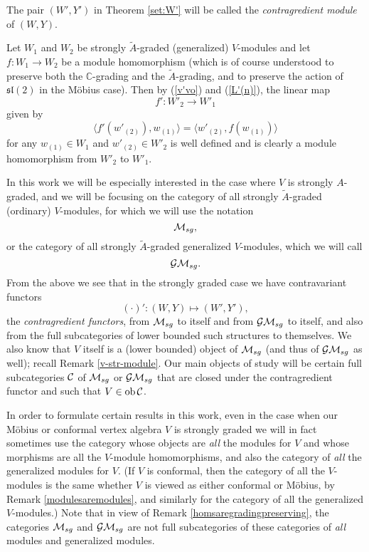 \documentclass[12pt]{article}
\begin{document}
\begin{defi}{\rm
The pair $(W',Y')$ in Theorem \ref{set:W'} will be called the {\em
contragredient module} of $(W,Y)$.}
\end{defi}

Let $W_1$ and $W_2$ be strongly $\tilde A$-graded (generalized)
$V$-modules and let $f:W_1\to W_2$ be a module homomorphism (which is
of course understood to preserve both the ${\mathbb C}$-grading and the
$\tilde A$-grading, and to preserve the action of ${\mathfrak s}{\mathfrak
l}(2)$ in the M\"obius case). Then by (\ref{v'vo}) and (\ref{L'(n)}),
the linear map
\[
f':W'_2\to W'_1
\]
given by
\begin{equation}\label{fprime}
\langle f'(w'_{(2)}), w_{(1)}\rangle=\langle
w'_{(2)},f(w_{(1)})\rangle
\end{equation}
for any $w_{(1)}\in W_1$ and $w'_{(2)}\in W'_2$ is well defined and is
clearly a module homomorphism {}from $W'_2$ to $W'_1$.

\begin{nota}\label{MGM}
{\rm In this work we will be especially interested in the case where
$V$ is strongly $A$-graded, and we will be focusing on the category of all
strongly $\tilde{A}$-graded (ordinary) $V$-modules, for which we will use the
notation
\[
{\cal M}_{sg},
\]
or the category of all strongly $\tilde{A}$-graded generalized $V$-modules,
which we will call
\[
{\cal GM}_{sg}.
\]  
{}From the above we see that in
the strongly graded case we have contravariant functors
\[
(\cdot)': (W,Y)\mapsto (W',Y'),
\]
the {\it contragredient functors}, {}from ${\cal M}_{sg}$ to itself and
{}from ${\cal GM}_{sg}$ to itself, and also from the full
subcategories of lower bounded such structures to themselves.
We also know that $V$ itself is a (lower bounded)
object of ${\cal M}_{sg}$ (and thus of ${\cal GM}_{sg}$ as well);
recall Remark \ref{v-str-module}. Our main objects of study will be
certain full subcategories ${\cal C}$ of ${\cal M}_{sg}$ or ${\cal
GM}_{sg}$ that are closed under the contragredient functor and such
that $V\in {\rm ob}\, {\cal C}$.}
\end{nota}

\begin{rema}{\rm
In order to formulate certain results in this work, even in the case
when our M\"obius or conformal vertex algebra $V$ is strongly graded
we will in fact sometimes use the category whose objects are {\it all}
the modules for $V$ and whose morphisms are all the $V$-module
homomorphisms, and also the category of {\it all} the generalized
modules for $V$.  (If $V$ is conformal, then the category of all the
$V$-modules is the same whether $V$ is viewed as either conformal or
M\"obius, by Remark \ref{modulesaremodules}, and similarly for the
category of all the generalized $V$-modules.)  Note that in view of
Remark \ref{homsaregradingpreserving}, the categories ${\cal M}_{sg}$
and ${\cal GM}_{sg}$ are not full subcategories of these categories of
{\it all} modules and generalized modules.}
\end{rema}
\end{document}
